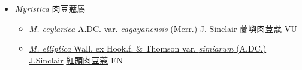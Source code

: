 
  \begin{itemize}
 \item[] \textit{Myristica} 肉豆蔻屬
                    
  \begin{itemize}
        \item[] \href{http://www.theplantlist.org/tpl1.1/search?q=Myristica+ceylanica+var.+cagayanensis}{\textit{M. ceylanica} A.DC. var. \textit{cagayanensis} (Merr.) J. Sinclair}   \href{\detokenize{http://taibnet.sinica.edu.tw/chi/taibnet_species_list.php?T2=蘭嶼肉荳蔻&T2_new_value=true&fr=y}}{蘭嶼肉荳蔻} VU
        \item[] \href{http://www.theplantlist.org/tpl1.1/search?q=Myristica+elliptica+var.+simiarum}{\textit{M. elliptica} Wall. ex Hook.f. \& Thomson var. \textit{simiarum} (A.DC.) J.Sinclair}   \href{\detokenize{http://taibnet.sinica.edu.tw/chi/taibnet_species_list.php?T2=紅頭肉豆蔻&T2_new_value=true&fr=y}}{紅頭肉豆蔻} EN
  \end{itemize}
  \end{itemize}
